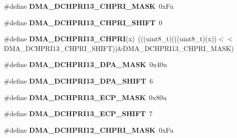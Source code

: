 \begin{DoxyCompactItemize}
\item 
\#define {\bfseries D\+M\+A\+\_\+\+D\+C\+H\+P\+R\+I13\+\_\+\+C\+H\+P\+R\+I\+\_\+\+M\+A\+SK}~0x\+Fu\hypertarget{group__DMA__Register__Masks_gad9e91383771ebbcea15c43585eada037}{}\label{group__DMA__Register__Masks_gad9e91383771ebbcea15c43585eada037}

\item 
\#define {\bfseries D\+M\+A\+\_\+\+D\+C\+H\+P\+R\+I13\+\_\+\+C\+H\+P\+R\+I\+\_\+\+S\+H\+I\+FT}~0\hypertarget{group__DMA__Register__Masks_ga71e8be2fe53b3e57287a73d382467140}{}\label{group__DMA__Register__Masks_ga71e8be2fe53b3e57287a73d382467140}

\item 
\#define {\bfseries D\+M\+A\+\_\+\+D\+C\+H\+P\+R\+I13\+\_\+\+C\+H\+P\+RI}(x)~(((uint8\+\_\+t)(((uint8\+\_\+t)(x))$<$$<$D\+M\+A\+\_\+\+D\+C\+H\+P\+R\+I13\+\_\+\+C\+H\+P\+R\+I\+\_\+\+S\+H\+I\+FT))\&D\+M\+A\+\_\+\+D\+C\+H\+P\+R\+I13\+\_\+\+C\+H\+P\+R\+I\+\_\+\+M\+A\+SK)\hypertarget{group__DMA__Register__Masks_gab1db4316293e7eda20fa296e51681172}{}\label{group__DMA__Register__Masks_gab1db4316293e7eda20fa296e51681172}

\item 
\#define {\bfseries D\+M\+A\+\_\+\+D\+C\+H\+P\+R\+I13\+\_\+\+D\+P\+A\+\_\+\+M\+A\+SK}~0x40u\hypertarget{group__DMA__Register__Masks_ga7d0dba9a621669e28a8c6c557d962502}{}\label{group__DMA__Register__Masks_ga7d0dba9a621669e28a8c6c557d962502}

\item 
\#define {\bfseries D\+M\+A\+\_\+\+D\+C\+H\+P\+R\+I13\+\_\+\+D\+P\+A\+\_\+\+S\+H\+I\+FT}~6\hypertarget{group__DMA__Register__Masks_ga94fae69ff7774aa7d1f24fd8b2387a40}{}\label{group__DMA__Register__Masks_ga94fae69ff7774aa7d1f24fd8b2387a40}

\item 
\#define {\bfseries D\+M\+A\+\_\+\+D\+C\+H\+P\+R\+I13\+\_\+\+E\+C\+P\+\_\+\+M\+A\+SK}~0x80u\hypertarget{group__DMA__Register__Masks_ga74ad97c0ca8dfdd5152b2db375389908}{}\label{group__DMA__Register__Masks_ga74ad97c0ca8dfdd5152b2db375389908}

\item 
\#define {\bfseries D\+M\+A\+\_\+\+D\+C\+H\+P\+R\+I13\+\_\+\+E\+C\+P\+\_\+\+S\+H\+I\+FT}~7\hypertarget{group__DMA__Register__Masks_ga462e7c666fbe9d355893654f7fe52cd9}{}\label{group__DMA__Register__Masks_ga462e7c666fbe9d355893654f7fe52cd9}

\item 
\#define {\bfseries D\+M\+A\+\_\+\+D\+C\+H\+P\+R\+I12\+\_\+\+C\+H\+P\+R\+I\+\_\+\+M\+A\+SK}~0x\+Fu\hypertarget{group__DMA__Register__Masks_gae4a41c199e83720c8912622f921f3993}{}\label{group__DMA__Register__Masks_gae4a41c199e83720c8912622f921f3993}


\end{DoxyCompactItemize}
